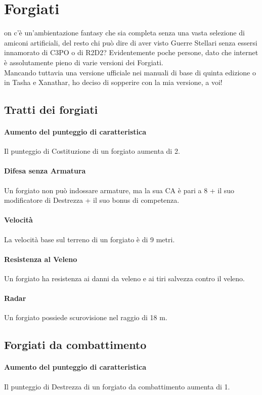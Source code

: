 \section{Forgiati}

on c'è un'ambientazione fantasy che sia completa senza una vasta selezione di amiconi artificiali, del resto chi può dire di aver visto Guerre Stellari senza essersi innamorato di C3PO o di R2D2? Evidentemente poche persone, dato che internet è assolutamente pieno di varie versioni dei Forgiati. \\ Mancando tuttavia una versione ufficiale nei manuali di base di quinta edizione o in Tasha e Xanathar, ho deciso di sopperire con la mia versione, a voi!

\subsection{Tratti dei forgiati}
\paragraph{Aumento del punteggio di caratteristica} Il punteggio di Costituzione di un forgiato aumenta di 2.
\paragraph{Difesa senza Armatura} Un forgiato non può indossare armature, ma la sua CA è pari a 8 + il suo modificatore di Destrezza + il suo bonus di competenza.
\paragraph{Velocità} La velocità base sul terreno di un forgiato è di 9 metri.
\paragraph{Resistenza al Veleno} Un forgiato ha resistenza ai danni da veleno e ai tiri salvezza contro il veleno.
\paragraph{Radar} Un forgiato possiede scurovisione nel raggio di 18 m.

\subsection{Forgiati da combattimento}
\paragraph{Aumento del punteggio di caratteristica} Il punteggio di Destrezza di un forgiato da combattimento aumenta di 1.

